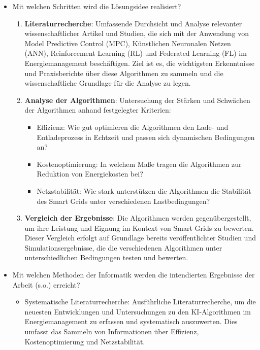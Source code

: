 \documentclass[12pt]{article} %
\begin{document}
\begin{itemize}

\item Mit welchen Schritten wird die Lösungsidee realisiert?

    \begin{enumerate}
        \item \textbf{Literaturrecherche}: Umfassende Durchsicht und Analyse relevanter wissenschaftlicher Artikel und Studien, die sich mit der Anwendung von Model Predictive Control (MPC), Künstlichen Neuronalen Netzen (ANN), Reinforcement Learning (RL) und Federated Learning (FL) im Energiemanagement beschäftigen. Ziel ist es, die wichtigsten Erkenntnisse und Praxisberichte über diese Algorithmen zu sammeln und die wissenschaftliche Grundlage für die Analyse zu legen.

        \item \textbf{Analyse der Algorithmen}: Untersuchung der Stärken und Schwächen der Algorithmen anhand festgelegter Kriterien:
            \begin{itemize}
                \item Effizienz: Wie gut optimieren die Algorithmen den Lade- und Entladeprozess in Echtzeit und passen sich dynamischen Bedingungen an?
                \item Kostenoptimierung: In welchem Maße tragen die Algorithmen zur Reduktion von Energiekosten bei?
                \item Netzstabilität: Wie stark unterstützen die Algorithmen die Stabilität des Smart Grids unter verschiedenen Lastbedingungen?
            \end{itemize}
        
        \item \textbf{Vergleich der Ergebnisse}: Die Algorithmen werden gegenübergestellt, um ihre Leistung und Eignung im Kontext von Smart Grids zu bewerten. Dieser Vergleich erfolgt auf Grundlage bereits veröffentlichter Studien und Simulationsergebnisse, die die verschiedenen Algorithmen unter unterschiedlichen Bedingungen testen und bewerten.
    \end{enumerate}

\item Mit welchen Methoden der Informatik werden die intendierten Ergebnisse der Arbeit (s.o.) erreicht?

    \begin{itemize}
        \item Systematische Literaturrecherche: Ausführliche Literaturrecherche, um die neuesten Entwicklungen und Untersuchungen zu den KI-Algorithmen im Energiemanagement zu erfassen und systematisch auszuwerten. Dies umfasst das Sammeln von Informationen über Effizienz, Kostenoptimierung und Netzstabilität.
        

\end{itemize}
\end{itemize}
\end{document}
